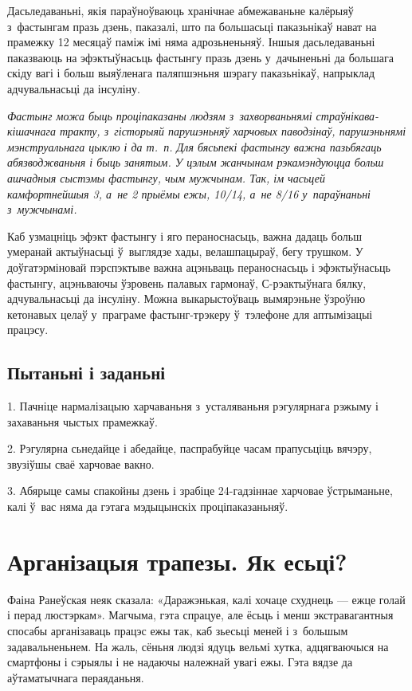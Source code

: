 Дасьледаваньні, якія параўноўваюць хранічнае абмежаваньне калёрыяў з~фастынгам празь дзень, паказалі, што па большасьці паказьнікаў нават на прамежку 12 месяцаў паміж імі няма адрозьненьняў. Іншыя дасьледаваньні паказваюць на эфэктыўнасьць фастынгу празь дзень у~дачыненьні да большага скіду вагі і больш выяўленага паляпшэньня шэрагу паказьнікаў, напрыклад адчувальнасьці да інсуліну.

\emph{Фастынг можа быць проціпаказаны людзям з~захворваньнямі страўнікава-кішачнага тракту, з~гісторыяй парушэньняў харчовых паводзінаў, парушэньнямі мэнструальнага цыклю і да т.~п. Для бясьпекі фастынгу важна пазьбягаць абязводжваньня і быць занятым. У цэлым жанчынам рэкамэндуюцца больш ашчадныя сыстэмы фастынгу, чым мужчынам. Так, ім часьцей камфортнейшыя 3, а~не 2 прыёмы ежы, 10/14, а~не 8/16 у~параўнаньні з~мужчынамі.}

Каб узмацніць эфэкт фастынгу і яго пераноснасьць, важна дадаць больш умеранай актыўнасьці ў~выглядзе хады, велашпацыраў, бегу трушком. У доўгатэрміновай пэрспэктыве важна ацэньваць пераноснасьць і эфэктыўнасьць фастынгу, ацэньваючы ўзровень палавых гармонаў, С-рэактыўнага бялку, адчувальнасьці да інсуліну. Можна выкарыстоўваць вымярэньне ўзроўню кетонавых целаў у~праграме фастынг-трэкеру ў~тэлефоне для аптымізацыі працэсу.

\subsection*{Пытаньні і заданьні}

1. Пачніце нармалізацыю харчаваньня з~усталяваньня рэгулярнага рэжыму і захаваньня чыстых прамежкаў.

2. Рэгулярна сьнедайце і абедайце, паспрабуйце часам прапусьціць вячэру, звузіўшы сваё харчовае вакно.

3. Абярыце самы спакойны дзень і зрабіце 24-гадзіннае харчовае ўстрыманьне, калі ў~вас няма да гэтага мэдыцынскіх проціпаказаньняў.


\section{Арганізацыя трапезы. Як есьці?}

Фаіна Ранеўская неяк сказала: «Даражэнькая, калі хочаце схуднець — ежце голай і перад люстэркам». Магчыма, гэта спрацуе, але ёсьць і менш экстравагантныя спосабы арганізаваць працэс ежы так, каб зьесьці меней і з~большым задавальненьнем. На жаль, сёньня людзі ядуць вельмі хутка, адцягваючыся на смартфоны і сэрыялы і не надаючы належнай увагі ежы. Гэта вядзе да аўтаматычнага пераяданьня.

